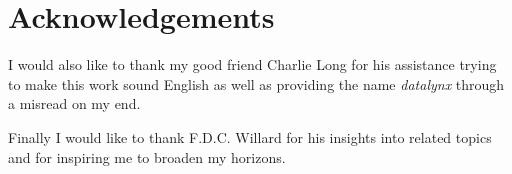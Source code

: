 \documentclass[bachelor_paper.tex]{subfiles}
\begin{document}
\section*{Acknowledgements}
    \label{chap:acknowledgements}
    \thispagestyle{empty}
    
    I would also like to thank my good friend Charlie Long for his assistance trying to make this work sound English as well as providing the name \emph{datalynx} through a misread on my end.

    Finally I would like to thank F.D.C. Willard for his insights into related topics and for inspiring me to broaden my horizons.
\end{document}
